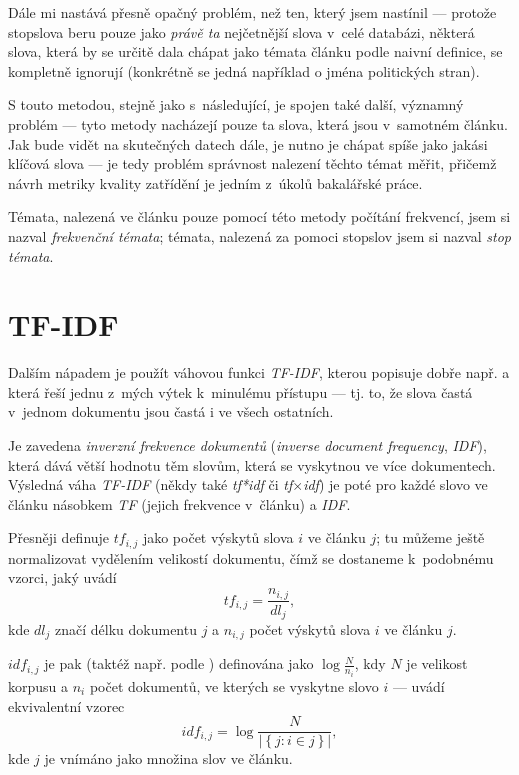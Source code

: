 \documentclass[12pt,a4paper]{report}
\begin{document}
Dále mi nastává přesně opačný problém, než ten, který jsem nastínil --- protože stopslova beru pouze jako \emph{právě ta} nejčetnější slova v~celé databázi, některá slova, která by se určitě dala chápat jako témata článku podle naivní definice, se kompletně ignorují (konkrétně se jedná například o jména politických stran).

S touto metodou, stejně jako s~následující, je spojen také další, významný problém --- tyto metody nacházejí pouze ta slova, která jsou v~samotném článku. Jak bude vidět na skutečných datech dále, je nutno je chápat spíše jako jakási klíčová slova --- je tedy problém správnost nalezení těchto témat měřit, přičemž návrh metriky kvality zatřídění je jedním z~úkolů bakalářské práce.

Témata, nalezená ve článku pouze pomocí této metody počítání frekvencí, jsem si nazval \emph{frekvenční témata}; témata, nalezená za pomoci stopslov jsem si nazval \emph{stop témata}.

\section{TF-IDF}
\label{sec:tfidf_teory}
Dalším nápadem je použít váhovou funkci \emph{TF-IDF}, kterou popisuje dobře např. \cite{approaches} a která řeší jednu z~mých výtek k~minulému přístupu --- tj. to, že slova častá v~jednom dokumentu jsou častá i ve všech ostatních.

Je zavedena \emph{inverzní frekvence dokumentů} (\emph{inverse document frequency}, \emph{IDF}), která dává větší hodnotu těm slovům, která se vyskytnou ve více dokumentech. Výsledná váha \emph{TF-IDF} (někdy také \emph{tf*idf} či \emph{tf$\times$idf}) je poté pro každé slovo ve článku násobkem \emph{TF} (jejich  frekvence v~článku) a \emph{IDF}.

Přesněji definuje \cite{understanding} $tf_{i,j}$  jako počet výskytů slova $i$ ve článku $j$; tu můžeme ještě normalizovat vydělením velikostí do\-ku\-men\-tu, čímž se do\-sta\-ne\-me k~podobnému vzorci, jaký uvádí \cite{wikitfidf} $$tf_{i,j}=\frac{n_{i,j}}{dl_j},$$ kde $dl_j$ značí délku dokumentu $j$ a $n_{i,j}$ počet výskytů slova $i$ ve článku $j$.

$idf_{i,j}$ je pak (taktéž např. podle \cite{understanding}) definována jako $\log\frac{N}{n_i}$, kdy $N$ je velikost korpusu a $n_i$ počet dokumentů, ve kterých se vyskytne slovo $i$ --- \cite{wikitfidf} uvádí ekvivalentní vzorec $$idf_{i,j}=\log\frac{N}{\left|\left\{j: i \in j\right\}\right|},$$ kde $j$ je vnímáno jako množina slov ve článku.
\end{document}

